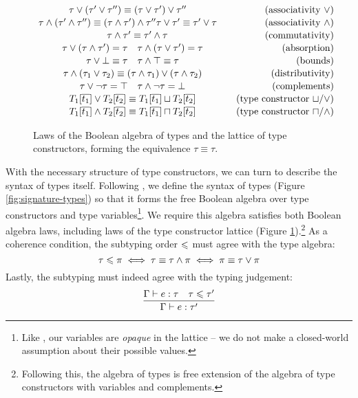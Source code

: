 \begin{figure}
    \centering
    $$ \renewcommand\arraystretch{1.1} \begin{array}{cr}
    \tau \join (\tau' \join \tau'') \equiv (\tau \join \tau') \join \tau'' \quad 
    & \text{(associativity \mbox{$\join$})}
    \\
    \tau \meet (\tau' \meet \tau'') \equiv (\tau \meet \tau') \meet \tau''
    \tau \join \tau' \equiv \tau' \join \tau  \quad 
    & \text{(associativity \mbox{$\meet$})} 
    \\
    \quad
    \tau \meet \tau' \equiv \tau' \meet \tau 
    & \text{(commutativity)}
    \\
    \tau \join (\tau \meet \tau') = \tau
    \quad 
    \tau \meet (\tau \join \tau') = \tau
    & \text{(absorption)}
    \\ 
    \tau \join \bot \equiv \tau
    \quad 
    \tau \meet \top \equiv \tau 
    & \text{(bounds)} 
    \\
    \tau \meet (\tau_1 \join \tau_2) \equiv (\tau \meet \tau_1) \join (\tau \meet \tau_2)
    & \text{(distributivity)}
    \\
    \tau \join \comp \tau = \top 
    \quad
    \tau \meet \comp \tau = \bot
    & \text{(complements)} 
    \\ 
    T_1[\overline {t_1}] \join T_2[\overline {t_2}] \equiv T_1[\overline {t_1}] \sqcup T_2[\overline {t_2}]
    & \text{(type constructor $\cjoin$/$\join$)}
    \\
    T_1[\overline {t_1}] \meet T_2[\overline {t_2}] \equiv T_1[\overline {t_1}] \sqcap T_2[\overline {t_2}]
    & \text{(type constructor $\cmeet$/$\meet$)}
    \end{array} $$
    \caption{Laws of the Boolean algebra of types and the lattice of type constructors, forming the equivalence $\tau \equiv \tau$.}
    \label{fig:boolean-laws}
\end{figure}

With the necessary structure of type constructors, we can turn to describe the syntax of types itself. Following \textcite{mlstruct}, we define the syntax of types (Figure \ref{fig:signature-types}) so that it forms the free Boolean algebra over type constructors and type variables\footnote{Like \textcite{dolan-thesis}, our variables are \emph{opaque} in the lattice -- we do not make a closed-world assumption about their possible values.}. We require this algebra satisfies both Boolean algebra laws, including laws of the type constructor lattice (Figure \ref{fig:boolean-laws}).\footnote{Following this, the algebra of types is free extension of the algebra of type constructors with variables and complements.} As a coherence condition, the subtyping order $\leqslant$ must agree with the type algebra:
$$ \tau \leqslant \pi \iff \tau \equiv \tau \land \pi \iff \pi \equiv \tau \lor \pi $$
Lastly, the subtyping must indeed agree with the typing judgement:
$$ \dfrac{\Gamma \vdash e : \tau \quad \tau \leqslant \tau'}{\Gamma \vdash e : \tau'}  $$

